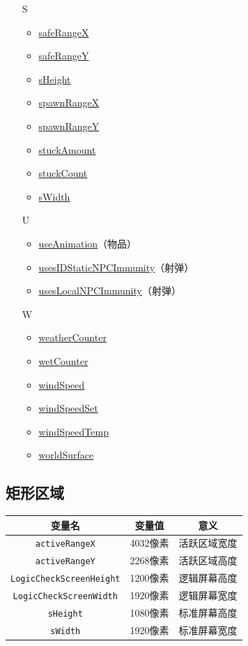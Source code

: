 \begin{multicols}{2}[]
{\begin{itemize}
\begin{itemize}
	\item \hyperref[tab8]{rockLayer}
	\end{itemize}
\item[S] \begin{itemize}
	\item \hyperref[tab4618]{safeRangeX}
	\item \hyperref[tab4618]{safeRangeY}
	\item \hyperref[tab9]{sHeight}
	\item \hyperref[tab4618]{spawnRangeX}
	\item \hyperref[tab4618]{spawnRangeY}
	\item \hyperref[tab10]{stuckAmount}
	\item \hyperref[tab10]{stuckCount}
	\item \hyperref[tab9]{sWidth}
	\end{itemize}
\item[U] \begin{itemize}
	\item \hyperref[sec28]{useAnimation}（物品）
	\item \hyperref[sec25]{usesIDStaticNPCImmunity}（射弹）
	\item \hyperref[sec25]{usesLocalNPCImmunity}（射弹）
	\end{itemize}
\item[W] \begin{itemize}
	\item \href{https://www.bbstr.net/threads/133/#post-623}{weatherCounter}
	\item \hyperref[tab10]{wetCounter}
	\item \href{https://www.bbstr.net/threads/133/#post-623}{windSpeed}
	\item \href{https://www.bbstr.net/threads/133/#post-623}{windSpeedSet}
	\item \href{https://www.bbstr.net/threads/133/#post-623}{windSpeedTemp}
	\item \hyperref[tab8]{worldSurface}
	\end{itemize}
\end{itemize}
}
\end{multicols}

\subsection{矩形区域}\label{tab9}
\begin{longtable}{|c|c|c|}
\hline 变量名&变量值&意义\\\hline
\endhead
\hline
\endfoot
{\lstinline!activeRangeX!}&4032像素&活跃区域宽度\\\hline
{\lstinline!activeRangeY!}&2268像素&活跃区域高度\\\hline
{\lstinline!LogicCheckScreenHeight!}&1200像素&逻辑屏幕高度\\\hline
{\lstinline!LogicCheckScreenWidth!}&1920像素&逻辑屏幕宽度\\\hline
{\lstinline!sHeight!}&1080像素&标准屏幕高度\\\hline
{\lstinline!sWidth!}&1920像素&标准屏幕宽度\\
\end{longtable}

